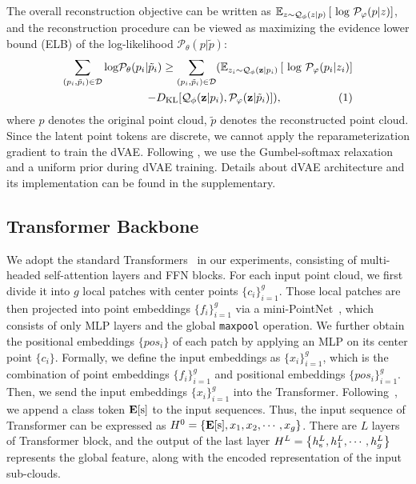 \documentclass[10pt,twocolumn,letterpaper]{article}
\begin{document}
The overall reconstruction objective can be written as $\mathbb{E}_{z\sim \mathcal{Q}_{\phi}(z|p)} \left [ \textup{ log  } \mathcal{P}_{\varphi  }(p|z) \right ]$, and the reconstruction procedure can be viewed as maximizing the evidence lower bound (ELB) of the log-likelihood $\mathcal{P}_{\theta }(p|\tilde{p})$\cite{ramesh2021zero}:
\small	
\begin{equation} \label{eq:elb}
\begin{split}	
	\sum_{(p_{i},\tilde{p}_{i})\in\mathcal{D}}\textup{log} \mathcal{P}_{\theta }(p_{i}|\tilde{p}_{i}) \geq   \sum_{(p_{i},\tilde{p}_{i})\in\mathcal{D}}(\mathbb{E}_{z_{i}\sim \mathcal{Q}_{\phi}(\mathbf{z}|p_{i})} \left [ \textup{ log  } \mathcal{P}_{\varphi  }(p_{i}|z_{i}) \right ]   \\
	- D_{\textup{KL}} [\mathcal{Q}_{\phi}(\mathbf{z}|p_{i}),\mathcal{P}_{\varphi }(\mathbf{z}|\tilde{p}_{i})  ] ),   \qquad \qquad \quad    (1)\nonumber%
\end{split}%
\end{equation}%
\normalsize
where $p$ denotes the original point cloud, $\tilde{p}$ denotes the reconstructed point cloud. Since the latent point tokens are discrete, we cannot apply the reparameterization gradient to train the dVAE. Following \cite{ramesh2021zero}, we use the Gumbel-softmax relaxation\cite{jang2016categorical} and a uniform prior during dVAE training. Details about dVAE architecture and its implementation can be found in the supplementary.


\subsection{Transformer Backbone}
We adopt the standard Transformers~\cite{vaswani2017attention} in our experiments, consisting of multi-headed self-attention layers and FFN blocks. For each input point cloud, we first divide  it into $g$ local patches with center points $\{c_i\}_{i=1}^g$.  Those local patches are then projected into point embeddings $\{f_i\}_{i=1}^g$  via a mini-PointNet~\cite{pointnet}, which consists of only MLP layers and the global \texttt{maxpool} operation. We further obtain the positional embeddings $\{pos_i\}$ of each patch by applying  an MLP  on its  center point $\{c_i\}$.  Formally, we define the input embeddings as $\{x_i\}_{i=1}^g$, which is the combination of point embeddings $\{f_i\}_{i=1}^g$ and positional embeddings $\{pos_i\}_{i=1}^g$. Then, we send the input embeddings  $\{x_i\}_{i=1}^g$ into the Transformer. Following~\cite{bert}, we append a class token $\mathbf{E}[\textup{s}]$ to the input sequences. Thus, the input sequence of Transformer can be expressed as $ H^{0}=\left \{ \mathbf{E}[\textup{s}],  x_{1},  x_{2}, \cdots ,  x_{g} \right \}$. There are $L$ layers of Transformer block, and the output of the last layer $ H^{L}= \left \{  h_{\textup{s}}^{L},  h_{1}^{L}, \cdots ,  h_{g}^{L}\right \}$ represents the global feature, along with the encoded representation of the input sub-clouds. 
\end{document}
